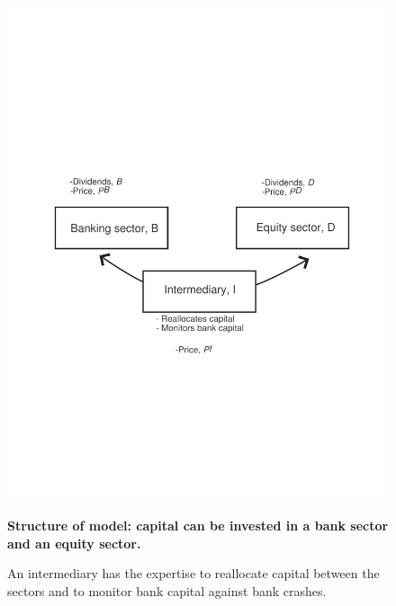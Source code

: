 \documentclass[11pt]{article}
\begin{document}
\ 
\vfill
\begin{figure}[!htb]
\centerline{\includegraphics[width=7in]{Figure1}}
\noindent\caption{}
{\bf Structure of model: capital can be invested in a bank sector and an equity sector.} 

An intermediary has the expertise to reallocate capital between the sectors and to monitor bank capital against bank crashes. \label{fig:0}
\end{figure}
\vfill
\ 
\end{document}
